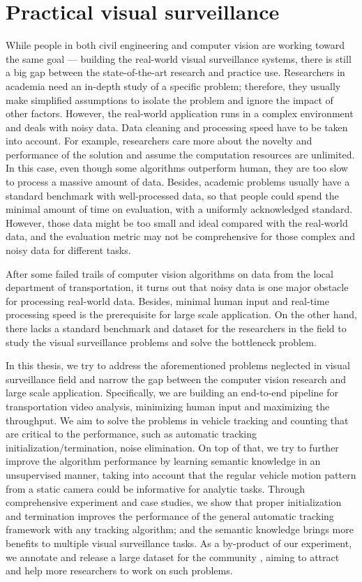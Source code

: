 \section{Practical visual surveillance}
\label{sec:intro-surveillance-cv}

While people in both civil engineering and computer vision are working toward the same goal --- building the real-world visual surveillance systems, there is still a big gap between the state-of-the-art research and practice use.
Researchers in academia need an in-depth study of a specific problem; therefore, they usually make simplified assumptions to isolate the problem and ignore the impact of other factors. 
However, the real-world application runs in a complex environment and deals with noisy data. Data cleaning and processing speed have to be taken into account.
For example, researchers care more about the novelty and performance of the solution and assume the computation resources are unlimited. 
In this case, even though some algorithms outperform human, they are too slow to process a massive amount of data. 
Besides, academic problems usually have a standard benchmark with well-processed data, so that people could spend the minimal amount of time on evaluation, with a uniformly acknowledged standard.
However, those data might be too small and ideal compared with the real-world data, and the evaluation metric may not be comprehensive for those complex and noisy data for different tasks.

After some failed trails of computer vision algorithms on data from the local department of transportation, it turns out that noisy data is one major obstacle for processing real-world data. 
Besides, minimal human input and real-time processing speed is the prerequisite for large scale application.
On the other hand, there lacks a standard benchmark and dataset for the researchers in the field to study the visual surveillance problems and solve the bottleneck problem.

In this thesis, we try to address the aforementioned problems neglected in visual surveillance field and narrow the gap between the computer vision research and large scale application. 
Specifically, we are building an end-to-end pipeline for transportation video analysis, minimizing human input and maximizing the throughput.
We aim to solve the problems in vehicle tracking and counting that are critical to the performance, such as automatic tracking initialization/termination, noise elimination.
On top of that, we try to further improve the algorithm performance by learning semantic knowledge in an unsupervised manner, taking into account that the regular vehicle motion pattern from a static camera could be informative for analytic tasks.
Through comprehensive experiment and case studies, we show that proper initialization and termination improves the performance of the general automatic tracking framework with any tracking algorithm; and the semantic knowledge brings more benefits to multiple visual surveillance tasks.
As a by-product of our experiment, we annotate and release a large dataset for the community \cite{yanziVehicleTracker}, aiming to attract and help more researchers to work on such problems.